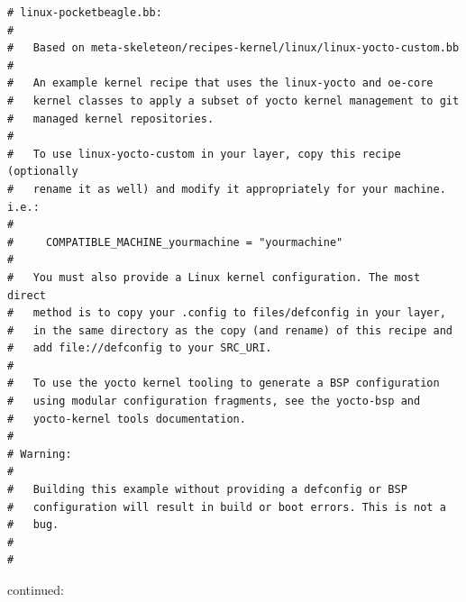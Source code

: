 \documentclass[a4paper,12pt,obeyspaces,spaces,hyphens]{article}
\begin{document}
\begin{tcolorbox}[enhanced jigsaw,colback=bg,boxrule=0pt,arc=0pt]
\begin{verbatim}
# linux-pocketbeagle.bb:
#
#   Based on meta-skeleteon/recipes-kernel/linux/linux-yocto-custom.bb
#
#   An example kernel recipe that uses the linux-yocto and oe-core
#   kernel classes to apply a subset of yocto kernel management to git
#   managed kernel repositories.
#
#   To use linux-yocto-custom in your layer, copy this recipe (optionally
#   rename it as well) and modify it appropriately for your machine. i.e.:
#
#     COMPATIBLE_MACHINE_yourmachine = "yourmachine"
#
#   You must also provide a Linux kernel configuration. The most direct
#   method is to copy your .config to files/defconfig in your layer,
#   in the same directory as the copy (and rename) of this recipe and
#   add file://defconfig to your SRC_URI.
#
#   To use the yocto kernel tooling to generate a BSP configuration
#   using modular configuration fragments, see the yocto-bsp and
#   yocto-kernel tools documentation.
#
# Warning:
#
#   Building this example without providing a defconfig or BSP
#   configuration will result in build or boot errors. This is not a
#   bug.
#
#
\end{verbatim}
\end{tcolorbox}

continued:
\end{document}
